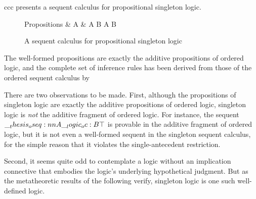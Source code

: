 \begin{figure*}
\begin{tabular}{ccc}
 presents a sequent calculus for propositional singleton logic.
%
\begin{figure}[t]
  \begin{syntax*}
    Propositions &
      A & \alpha \mid A \plus B \mid \zero \mid A \with B \mid \top
  \end{syntax*}
  \caption{A sequent calculus for propositional singleton logic\label{fig:singleton-logic:seq-calc}}
\end{figure}
%
The well-formed propositions are exactly the additive propositions of ordered logic, and the complete set of inference rules has been derived from those of the ordered sequent calculus by 

There are two observations to be made.
% 
First, although the propositions of singleton logic are exactly the additive propositions of ordered logic, singleton logic is \emph{not} the additive fragment of ordered logic.
For instance, the sequent $\oseq{A \oc B |- \top}$ is provable in the additive fragment of ordered logic, but it
is not even a well-formed sequent in the singleton sequent calculus, for the simple reason that it violates the single-antecedent restriction.

Second, it seems quite odd to contemplate a logic without an implication connective that embodies the logic's underlying hypothetical judgment.
But as the metatheoretic results of the following  verify, singleton logic is one such well-defined logic.


\end{tabular}
\end{figure*}
